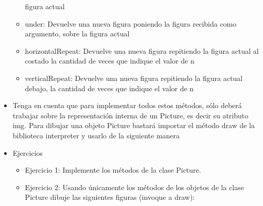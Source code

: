 \documentclass{article}
\begin{document}
\begin{itemize}
\begin{itemize}
		            figura actual
		      \item under: Devuelve una nueva figura poniendo la figura recibida como argumento, sobre la
		            figura actual
		      \item horizontalRepeat: Devuelve una nueva figura repitiendo la figura actual al costado la
		            cantidad de veces que indique el valor de n
		      \item verticalRepeat: Devuelve una nueva figura repitiendo la figura actual debajo, la cantidad
		            de veces que indique el valor de n
	      \end{itemize}
	\item Tenga en cuenta que para implementar todos estos métodos, sólo deberá trabajar sobre la representación interna de un Picture, es decir su atributo img.
	      Para dibujar una objeto Picture bastará importar el método draw de la biblioteca interpreter
	      y usarlo de la siguiente manera
\end{itemize}
\begin{itemize}
	\item Ejercicios
	      \begin{itemize}
		      \item Ejercicio 1: Implemente los métodos de la clase Picture.
		      \item Ejercicio 2: Usando únicamente los métodos de los objetos de la clase Picture dibuje las siguientes figuras (invoque a draw):
	      \end{itemize}
\end{itemize}
\pagebreak
\end{document}

